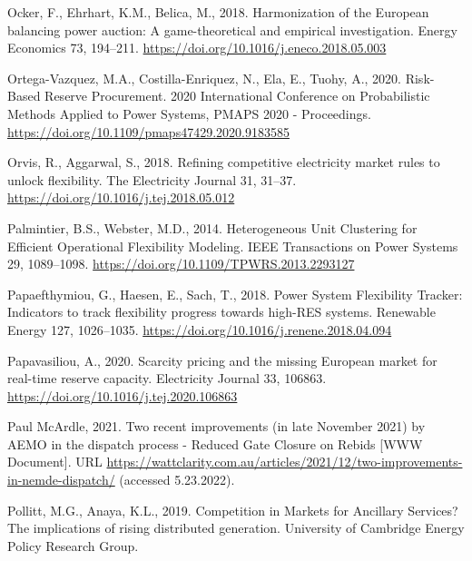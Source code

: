 \documentclass[12pt,a4paper,]{report}
\newlength{\cslhangindent}
\newenvironment{CSLReferences}[2] %
 {%
  \setlength{\parindent}{0pt}
  \ifodd #1 \everypar{\setlength{\hangindent}{\cslhangindent}}\ignorespaces\fi
  \ifnum #2 > 0
  \setlength{\parskip}{#2\baselineskip}
  \fi
 }%
 {}
\begin{document}
\begin{CSLReferences}{1}{0}
\leavevmode{}%
Ocker, F., Ehrhart, K.M., Belica, M., 2018. Harmonization of the
{European} balancing power auction: {A} game-theoretical and empirical
investigation. Energy Economics 73, 194--211.
\url{https://doi.org/10.1016/j.eneco.2018.05.003}

\leavevmode{}%
Ortega-Vazquez, M.A., Costilla-Enriquez, N., Ela, E., Tuohy, A., 2020.
Risk-{Based Reserve Procurement}. 2020 International Conference on
Probabilistic Methods Applied to Power Systems, PMAPS 2020 -
Proceedings. \url{https://doi.org/10.1109/pmaps47429.2020.9183585}

\leavevmode{}%
Orvis, R., Aggarwal, S., 2018. Refining competitive electricity market
rules to unlock flexibility. The Electricity Journal 31, 31--37.
\url{https://doi.org/10.1016/j.tej.2018.05.012}

\leavevmode{}%
Palmintier, B.S., Webster, M.D., 2014. Heterogeneous {Unit Clustering}
for {Efficient Operational Flexibility Modeling}. IEEE Transactions on
Power Systems 29, 1089--1098.
\url{https://doi.org/10.1109/TPWRS.2013.2293127}

\leavevmode{}%
Papaefthymiou, G., Haesen, E., Sach, T., 2018. Power {System Flexibility
Tracker}: {Indicators} to track flexibility progress towards high-{RES}
systems. Renewable Energy 127, 1026--1035.
\url{https://doi.org/10.1016/j.renene.2018.04.094}

\leavevmode{}%
Papavasiliou, A., 2020. Scarcity pricing and the missing {European}
market for real-time reserve capacity. Electricity Journal 33, 106863.
\url{https://doi.org/10.1016/j.tej.2020.106863}

\leavevmode{}%
Paul McArdle, 2021. Two recent improvements (in late {November} 2021) by
{AEMO} in the dispatch process - {Reduced Gate Closure} on {Rebids}
{[}WWW Document{]}. URL
\url{https://wattclarity.com.au/articles/2021/12/two-improvements-in-nemde-dispatch/}
(accessed 5.23.2022).

\leavevmode{}%
Pollitt, M.G., Anaya, K.L., 2019. Competition in {Markets} for
{Ancillary Services}? {The} implications of rising distributed
generation. {University of Cambridge Energy Policy Research Group}.


\end{CSLReferences}
\end{document}
